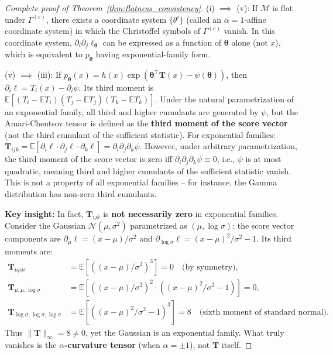 \documentclass[12pt,a4paper]{article}
\theoremstyle{plain}
\theoremstyle{definition}
\theoremstyle{remark}
\newcommand{\E}{\mathbb{E}}
\newcommand{\MM}{\mathcal{M}}
\newcommand{\ACT}{\mathbf{T}}    %
\begin{document}
\begin{proof}[Complete proof of Theorem~\ref{thm:flatness_consistency}]

(i) $\implies$ (v): If $\MM$ is flat under $\Gamma^{(e)}$, there exists a coordinate system $\{\theta^i\}$ (called an $\alpha=1$-affine coordinate system) in which the Christoffel symbols of $\Gamma^{(e)}$ vanish. In this coordinate system, $\partial_i \partial_j \ell_{\bm{\theta}}$ can be expressed as a function of $\bm{\theta}$ alone (not $x$), which is equivalent to $p_{\bm{\theta}}$ having exponential-family form.

(v) $\implies$ (iii): If $p_{\bm{\theta}}(x) = h(x)\exp(\bm{\theta}^\top \mathbf{T}(x) - \psi(\bm{\theta}))$, then $\partial_i \ell = T_i(x) - \partial_i \psi$. Its third moment is $\E[(T_i - \E T_i)(T_j - \E T_j)(T_k - \E T_k)]$. Under the natural parametrization of an exponential family, all third and higher cumulants are generated by $\psi$, but the Amari-Chentsov tensor is defined as the \textbf{third moment of the score vector} (not the third cumulant of the sufficient statistic). For exponential families: $\ACT_{ijk} = \E[\partial_i\ell \cdot \partial_j\ell \cdot \partial_k\ell] = \partial_i\partial_j\partial_k\psi$. However, under arbitrary parametrization, the third moment of the score vector is zero iff $\partial_i\partial_j\partial_k\psi \equiv 0$, i.e., $\psi$ is at most quadratic, meaning third and higher cumulants of the sufficient statistic vanish. This is not a property of all exponential families -- for instance, the Gamma distribution has non-zero third cumulants.

\textbf{Key insight:} In fact, $\ACT_{ijk}$ is \textbf{not necessarily zero} in exponential families. Consider the Gaussian $\mathcal{N}(\mu, \sigma^2)$ parametrized as $(\mu, \log\sigma)$: the score vector components are $\partial_\mu\ell = (x-\mu)/\sigma^2$ and $\partial_{\log\sigma}\ell = (x-\mu)^2/\sigma^2 - 1$. Its third moments are:
\begin{align*}
    \ACT_{\mu\mu\mu} &= \E[((x-\mu)/\sigma^2)^3] = 0 \quad \text{(by symmetry)},\\
    \ACT_{\mu,\mu,\log\sigma} &= \E[((x-\mu)/\sigma^2)^2 \cdot ((x-\mu)^2/\sigma^2 - 1)] = 0,\\
    \ACT_{\log\sigma,\log\sigma,\log\sigma} &= \E[((x-\mu)^2/\sigma^2 - 1)^3] = 8 \quad \text{(sixth moment of standard normal)}.
\end{align*}
Thus $\|\ACT\|_{\infty} = 8 \neq 0$, yet the Gaussian is an exponential family. What truly vanishes is the \textbf{$\alpha$-curvature tensor} (when $\alpha = \pm 1$), not $\ACT$ itself.


\end{proof}
\end{document}
